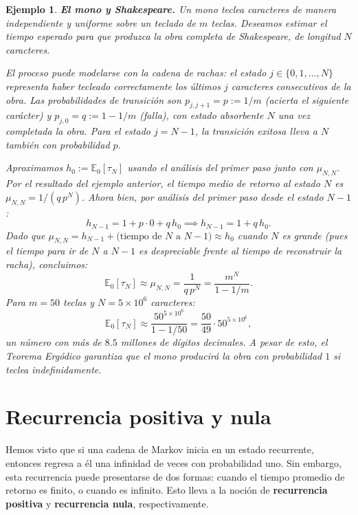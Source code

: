 \documentclass[12pt]{book}
\newtheorem{example}{Ejemplo}[chapter]
\begin{document}
\begin{example}
    \textbf{El mono y Shakespeare.}
    Un mono teclea caracteres de manera independiente y uniforme sobre un teclado de $m$ teclas. Deseamos estimar el tiempo esperado para que produzca la obra completa de Shakespeare, de longitud $N$ caracteres.

    El proceso puede modelarse con la cadena de rachas: el estado $j\in\{0,1,\dots,N\}$ representa haber tecleado correctamente los últimos $j$ caracteres consecutivos de la obra. Las probabilidades de transición son $p_{j,j+1} = p := 1/m$ (acierta el siguiente carácter) y $p_{j,0} = q := 1-1/m$ (falla), con estado absorbente $N$ una vez completada la obra. Para el estado $j=N-1$, la transición exitosa lleva a $N$ también con probabilidad $p$.

    Aproximamos $h_0 := \mathbb{E}_0[\tau_N]$ usando el análisis del primer paso junto con $\mu_{N,N}$. Por el resultado del ejemplo anterior, el tiempo medio de retorno al estado $N$ es $\mu_{N,N} = 1/(q\,p^N)$. Ahora bien, por análisis del primer paso desde el estado $N-1$:
    \[
        h_{N-1} = 1 + p \cdot 0 + q\, h_0 \implies h_{N-1} = 1 + q\,h_0.
    \]
     Dado que $\mu_{N,N} = h_{N-1} + \text{(tiempo de } N\text{ a }N-1) \approx h_0$ cuando $N$ es grande (pues el tiempo para ir de $N$ a $N-1$ es despreciable frente al tiempo de reconstruir la racha), concluimos:
    \[
        \mathbb{E}_0[\tau_N] \approx \mu_{N,N} = \frac{1}{q\,p^N} = \frac{m^N}{1 - 1/m}.
    \]
    Para $m=50$ teclas y $N=5\times 10^6$ caracteres:
    \[
        \mathbb{E}_0[\tau_N] \approx \frac{50^{5\times 10^6}}{1-1/50} = \frac{50}{49}\cdot 50^{5\times 10^6},
    \]
    un número con más de $8.5$ millones de dígitos decimales. A pesar de esto, el Teorema Ergódico garantiza que el mono \emph{producirá la obra con probabilidad $1$} si teclea indefinidamente.
\end{example}

\section{Recurrencia positiva y nula}

Hemos visto que si una cadena de Markov inicia en un estado recurrente, entonces regresa a él una infinidad de veces con probabilidad uno. Sin embargo, esta recurrencia puede presentarse de dos formas: cuando el tiempo promedio de retorno es finito, o cuando es infinito. Esto lleva a la noción de \textbf{recurrencia positiva} y \textbf{recurrencia nula}, respectivamente.
\end{document}
